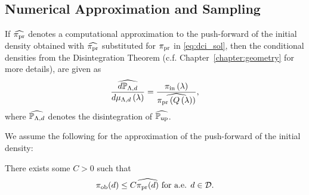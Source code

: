 \subsection{Numerical Approximation and Sampling}\label{sec:approx}
%
%
%
%



If $\widehat{\operatorname*{\pi_{pr}}}$ denotes a computational approximation to the push-forward of the initial density obtained with $\widehat{\operatorname*{\pi_{pr}}}$ substituted for $\operatorname*{\pi_{pr}}$ in \eqref{eq:dci_sol}, then the conditional densities from the Disintegration Theorem (c.f. Chapter~\ref{chapter:geometry} for more details), are given as
\[
\frac{\widehat{d\mathbb{P}_{{\Lambda}, d}}}{d\mu_{{\Lambda}, d}\left ( \lambda \right )} = \frac{\operatorname*{\pi_{in}}\left ( \lambda \right )}{ \widehat{\operatorname*{\pi_{pr}}\left ( Q\left ( \lambda \right ) \right )} },
\]
where $\widehat{\mathbb{P}_{{\Lambda}, d}}$ denotes the disintegration of $\widehat{\operatorname*{\mathbb{P}_{up}}}$.


We assume the following for the approximation of the push-forward of the initial density:
\begin{assumption}\label{as:predicted-theoreticalx}
There exists some $C>0$ such that
\[
\operatorname*{\pi_{ob}} (d) \leq C \widehat{\operatorname*{\pi_{pr}}(d)} \text{ for a.e. } d\in \mathcal{D}.
\]
\end{assumption}

